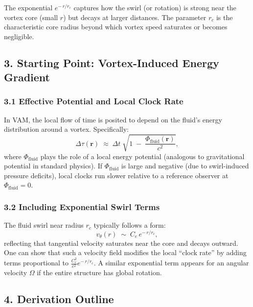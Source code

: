 The exponential \(e^{-\,r/r_c}\) captures how the swirl (or rotation) is strong near the vortex core (small \(r\)) but decays at larger distances. The parameter \(r_c\) is the characteristic core radius beyond which vortex speed saturates or becomes negligible.

\subsection*{3. Starting Point: Vortex-Induced Energy Gradient}

\subsubsection*{3.1 Effective Potential and Local Clock Rate}

In VAM, the local flow of time is posited to depend on the fluid’s energy distribution around a vortex. Specifically:
\[
    \Delta \tau(\mathbf{r})
    \;\approx\;
    \Delta t
    \;\sqrt{
        1
        \;-\;
        \frac{\Phi_{\mathrm{fluid}}(\mathbf{r})}{c^2}
    },
\]
where \(\Phi_{\mathrm{fluid}}\) plays the role of a local energy potential (analogous to gravitational potential in standard physics). If \(\Phi_{\mathrm{fluid}}\) is large and negative (due to swirl-induced pressure deficits), local clocks run slower relative to a reference observer at \(\Phi_{\mathrm{fluid}}=0\).

\subsubsection*{3.2 Including Exponential Swirl Terms}

The fluid swirl near radius \(r_c\) typically follows a form:
\[
    v_{\theta}(r)
    \;\sim\;
    C_e \,e^{-\,r/r_c},
\]
reflecting that tangential velocity saturates near the core and decays outward. One can show that such a velocity field modifies the local “clock rate” by adding terms proportional to \(\tfrac{C_e^2}{c^2} e^{-\,r/r_c}\). A similar exponential term appears for an angular velocity \(\Omega\) if the entire structure has global rotation.

\subsection*{4. Derivation Outline}

